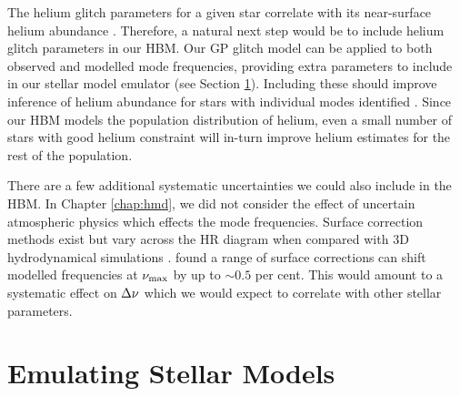 The helium glitch parameters for a given star correlate with its near-surface helium abundance \citep{Houdek.Gough2007}. Therefore, a natural next step would be to include helium glitch parameters in our HBM. Our GP glitch model can be applied to both observed and modelled mode frequencies, providing extra parameters to include in our stellar model emulator (see Section \ref{sec:conc-nn}). Including these should improve inference of helium abundance for stars with individual modes identified \citep[e.g.][]{Davies.SilvaAguirre.ea2016,Lund.SilvaAguirre.ea2017}. Since our HBM models the population distribution of helium, even a small number of stars with good helium constraint will in-turn improve helium estimates for the rest of the population.


There are a few additional systematic uncertainties we could also include in the HBM. In Chapter \ref{chap:hmd}, we did not consider the effect of uncertain atmospheric physics which effects the mode frequencies. Surface correction methods exist \citep[e.g.][]{Ball.Gizon2014,Kjeldsen.Bedding.ea2008} but vary across the HR diagram when compared with 3D hydrodynamical simulations \cite{Sonoi.Samadi.ea2015}. \citet{Compton.Bedding.ea2018} found a range of surface corrections can shift modelled frequencies at \({\nu_\mathrm{max}}\) by up to \(\sim 0.5\) per cent. This would amount to a systematic effect on \({\Delta\nu}\) which we would expect to correlate with other stellar parameters.


\section{Emulating Stellar Models}\label{sec:conc-nn}

